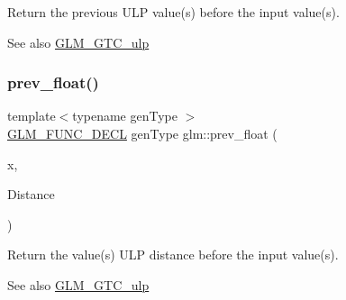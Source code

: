 Return the previous U\+LP value(s) before the input value(s). \begin{DoxySeeAlso}{See also}
\hyperlink{group__gtc__ulp}{G\+L\+M\+\_\+\+G\+T\+C\+\_\+ulp} 
\end{DoxySeeAlso}
\mbox{\label{group__gtc__ulp_gaa399d5b6472a70e8952f9b26ecaacdec}} 
\subsubsection{\texorpdfstring{prev\+\_\+float()}{prev\_float()}\hspace{0.1cm}{\footnotesize\ttfamily [2/2]}}
{\footnotesize\ttfamily template$<$typename gen\+Type $>$ \\
\hyperlink{setup_8hpp_ab2d052de21a70539923e9bcbf6e83a51}{G\+L\+M\+\_\+\+F\+U\+N\+C\+\_\+\+D\+E\+CL} gen\+Type glm\+::prev\+\_\+float (\begin{DoxyParamCaption}\item[{gen\+Type const \&}]{x,  }\item[{\hyperlink{group__core__precision_ga4fd29415871152bfb5abd588334147c8}{uint} const \&}]{Distance }\end{DoxyParamCaption})}

Return the value(s) U\+LP distance before the input value(s). \begin{DoxySeeAlso}{See also}
\hyperlink{group__gtc__ulp}{G\+L\+M\+\_\+\+G\+T\+C\+\_\+ulp} 
\end{DoxySeeAlso}
